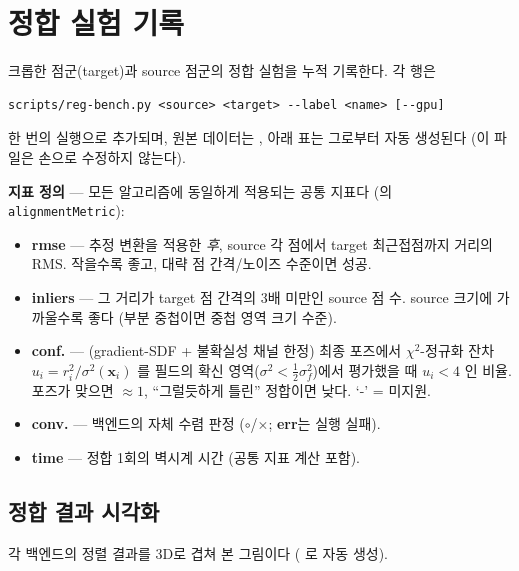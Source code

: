 \chapter{정합 실험 기록}
\label{ch:experiments}

크롭한 점군(target)과 source 점군의 정합 실험을 누적 기록한다. 각 행은
\begin{lstlisting}
scripts/reg-bench.py <source> <target> --label <name> [--gpu]
\end{lstlisting}
한 번의 실행으로 추가되며, 원본 데이터는
, 아래 표는 그로부터 자동
생성된다 (이 파일은 손으로 수정하지 않는다).

\textbf{지표 정의} --- 모든 알고리즘에 동일하게 적용되는 공통 지표다
(의 \texttt{alignmentMetric}):
\begin{itemize}
  \item \textbf{rmse} --- 추정 변환을 적용한 \emph{후}, source 각 점에서
  target 최근접점까지 거리의 RMS. 작을수록 좋고, 대략 점 간격/노이즈
  수준이면 성공.
  \item \textbf{inliers} --- 그 거리가 target 점 간격의 $3$배 미만인 source
  점 수. source 크기에 가까울수록 좋다 (부분 중첩이면 중첩 영역 크기 수준).
  \item \textbf{conf.} --- (gradient-SDF + 불확실성 채널 한정) 최종 포즈에서
  $\chi^2$-정규화 잔차 $u_i=r_i^2/\sigma^2(\mathbf{x}_i)$ 를 필드의 확신
  영역($\sigma^2<\tfrac{1}{2}\sigma_f^2$)에서 평가했을 때 $u_i<4$ 인 비율.
  포즈가 맞으면 $\approx 1$, ``그럴듯하게 틀린'' 정합이면 낮다. `-' = 미지원.
  \item \textbf{conv.} --- 백엔드의 자체 수렴 판정 ($\circ$/$\times$;
  \textbf{err}는 실행 실패).
  \item \textbf{time} --- 정합 1회의 벽시계 시간 (공통 지표 계산 포함).
\end{itemize}



\section{정합 결과 시각화}
각 백엔드의 정렬 결과를 3D로 겹쳐 본 그림이다 ( 로 자동 생성).

